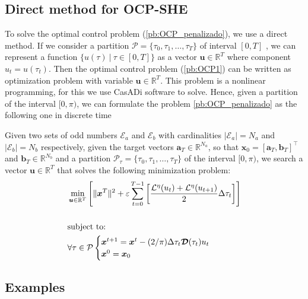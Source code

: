 \documentclass[twocolumn]{autart}    %
\begin{document}
\begin{remark}
\subsection{Direct method  for  OCP-SHE}

To solve the optimal control problem (\ref{pb:OCP_penalizado}), we use a direct method. 
%
If we consider a partition $\mathcal{P} = \{\tau_0,\tau_1,\dots,\tau_{T}\}$ of interval $[0,T]$ , we can represent a function $\{ u(\tau) \ | \ \tau \in [0,T]\}$ as a vector $\bm{u} \in \mathbb{R}^{T}$ where component $u_t = u(\tau_t)$.  
%
Then the optimal control problem (\ref{pb:OCP1}) can be written as optimization problem with variable $\bm{u} \in \mathbb{R}^{T}$. This problem is a nonlinear programming, for this we use CasADi software to solve. 
%
Hence, given a partition of the interval $[0,\pi)$, we can formulate the problem \ref{pb:OCP_penalizado} as the following one in discrete time
\newline

\begin{problem}\label{pb:numOCP2}
Given two sets of odd numbers $\mathcal{E}_a$ and $\mathcal{E}_b$ with cardinalities $|\mathcal{E}_a| = N_a$ and $|\mathcal{E}_b| = N_b$ respectively, given the target vectors $\bm{a}_T  \in \mathbb{R}^{N_a}$, so that $\bm{x}_0 = [\bm{a}_T,\bm{b}_T]^\top$ and $\bm{b}_T \in \mathbb{R}^{N_b}$ and a partition $\mathcal{P}_\tau = \{\tau_0,\tau_1,\dots,\tau_{T}\}$ of the interval $[0,\pi)$, we search a vector $\bm{u} \in \mathbb{R}^{T}$ that solves the following minimization problem:
\begin{align*}
	&\min_{\bm{u} \in \mathbb{R}^T} \Bigg[\| \bm{x}^T\|^2 + \varepsilon \sum_{t=0}^{T-1} \bigg[\frac{\mathcal{L}^\eta(u_{t}) + \mathcal{L}^\eta(u_{t+1})}{2}\Delta\tau_t \bigg]  \Bigg]  
	\\[15pt]
    &\notag \text{subject to: } 
    \\
    &\forall \tau \in \mathcal{P} \begin{cases}
    \bm{x}^{t+1} = \bm{x}^{t} - (2/\pi)\Delta \tau_t \bm{\mathcal{D}}(\tau_t)u_t 
    \\
    \bm{x}^0 = \bm{x}_0
    \end{cases} 
\end{align*}
\end{problem}

\subsection{Examples}


\end{remark}
\end{document}
